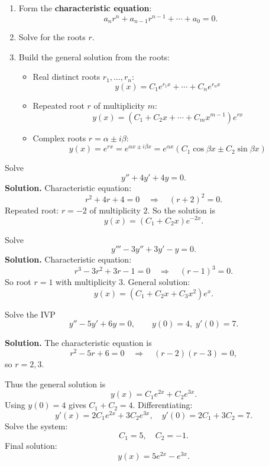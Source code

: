   \begin{enumerate}
    \item Form the \textbf{characteristic equation}:
      \[
        a_n r^n + a_{n-1} r^{n-1} + \cdots + a_0 = 0.
      \]
    \item Solve for the roots $r$.
    \item Build the general solution from the roots:
      \begin{itemize}
        \item Real distinct roots $r_1,\dots,r_n$:  
          \[y(x) = C_1 e^{r_1 x} + \cdots + C_n e^{r_n x}\]
        \item Repeated root $r$ of multiplicity $m$:  
          \[y(x) = (C_1 + C_2 x + \cdots + C_m x^{m-1}) e^{rx}\]
        \item Complex roots $r=\alpha \pm i\beta$:  
          \[y(x) = e^{rx} =e^{\alpha x \pm i\beta x} =  e^{\alpha x}(C_1\cos \beta x \pm C_2\sin \beta x)\]
      \end{itemize}
  \end{enumerate}


  \begin{example}
    Solve
    \[
    y'' + 4y' + 4y=0.
    \]
    \textbf{Solution.}  
    Characteristic equation:
    \[
    r^2+4r+4=0 \quad \Rightarrow \quad (r+2)^2=0.
    \]
    Repeated root: $r=-2$ of multiplicity $2$.  
    So the solution is
    \[
    y(x)=(C_1+C_2x)e^{-2x}.
    \]
  \end{example}


  \begin{example}
    Solve
    \[
    y''' - 3y'' + 3y' - y=0.
    \]
    \textbf{Solution.}  
    Characteristic equation:
    \[
    r^3-3r^2+3r-1=0 \quad \Rightarrow \quad (r-1)^3=0.
    \]
    So root $r=1$ with multiplicity 3.  
    General solution:
    \[
    y(x)=(C_1+C_2x+C_3x^2)e^x.
    \]
  \end{example}


  \begin{example}
    Solve the IVP
    \[
    y'' - 5y' + 6y = 0, \qquad y(0)=4,\; y'(0)=7.
    \]

    \textbf{Solution.} The characteristic equation is
    \[
    r^2 - 5r + 6 = 0 \quad \Rightarrow \quad (r-2)(r-3)=0,
    \]
    so $r=2,3$.  

    Thus the general solution is
    \[
    y(x) = C_1 e^{2x} + C_2 e^{3x}.
    \]
    Using $y(0)=4$ gives $C_1+C_2=4$.  
    Differentiating:
    \[
    y'(x) = 2C_1 e^{2x} + 3C_2 e^{3x}, \quad y'(0)=2C_1+3C_2=7.
    \]
    Solve the system:
    \[
    C_1=5, \quad C_2=-1.
    \]
    Final solution:
    \[
    y(x) = 5e^{2x} - e^{3x}.
    \]
  \end{example}


